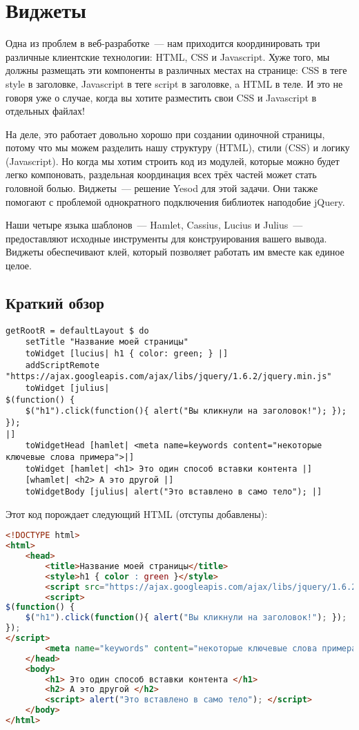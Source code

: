 \chapter{Виджеты}\label{chap:widgets}
Одна из проблем в веб-разработке~--- нам приходится координировать три
различные клиентские технологии: HTML, CSS и Javascript. Хуже того, мы должны
размещать эти компоненты в различных местах на странице: CSS в теге style в
заголовке, Javascript в теге script в заголовке, a HTML в теле. И это не говоря
уже о случае, когда вы хотите разместить свои CSS и Javascript в отдельных
файлах!

На деле, это работает довольно хорошо при создании одиночной страницы, потому
что мы можем разделить нашу структуру (HTML), стили (CSS) и логику
(Javascript). Но когда мы хотим строить код из модулей, которые можно будет
легко компоновать, раздельная координация всех трёх частей может стать головной
болью. Виджеты~--- решение Yesod для этой задачи. Они также помогают с
проблемой однократного подключения библиотек наподобие jQuery.

Наши четыре языка шаблонов~--- Hamlet, Cassius, Lucius и Julius~---
предоставляют исходные инструменты для конструирования вашего вывода. Виджеты
обеспечивают клей, который позволяет работать им вместе как единое целое.

\section{Краткий обзор}
\begin{lstlisting}
getRootR = defaultLayout $ do
    setTitle "Название моей страницы"
    toWidget [lucius| h1 { color: green; } |]
    addScriptRemote "https://ajax.googleapis.com/ajax/libs/jquery/1.6.2/jquery.min.js"
    toWidget [julius|
$(function() {
    $("h1").click(function(){ alert("Вы кликнули на заголовок!"); });
});
|]
    toWidgetHead [hamlet| <meta name=keywords content="некоторые ключевые слова примера">|]
    toWidget [hamlet| <h1> Это один способ вставки контента |]
    [whamlet| <h2> А это другой |]
    toWidgetBody [julius| alert("Это вставлено в само тело"); |]
\end{lstlisting}
Этот код порождает следующий HTML (отступы добавлены):
\begin{lstlisting}[language=HTML]
<!DOCTYPE html>
<html>
    <head>
        <title>Название моей страницы</title>
        <style>h1 { color : green }</style>
        <script src="https://ajax.googleapis.com/ajax/libs/jquery/1.6.2/jquery.min.js"></script>
        <script>
$(function() {
    $("h1").click(function(){ alert("Вы кликнули на заголовок!"); });
});
</script>
        <meta name="keywords" content="некоторые ключевые слова примера">
    </head>
    <body>
        <h1> Это один способ вставки контента </h1>
        <h2> А это другой </h2>
        <script> alert("Это вставлено в само тело"); </script>
    </body>
</html>
\end{lstlisting}

